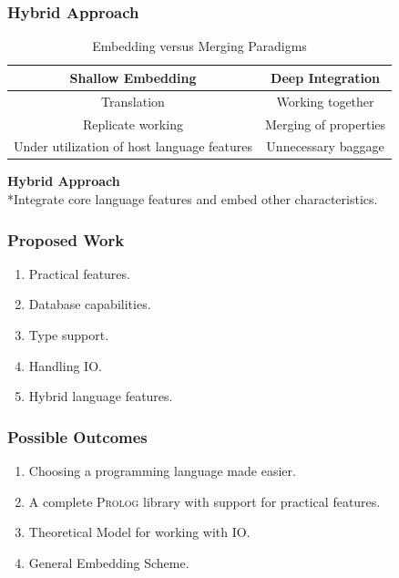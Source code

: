 \documentclass[aspectratio=1610]{beamer}
\begin{document}


\begin{frame}
\frametitle{Hybrid Approach}
\center
\begin{table}%
\begin{tabular}{|c|c|}
\hline
\textbf{Shallow Embedding} & \textbf{Deep Integration}\\
\hline
Translation & Working together\\
\hline
Replicate working & Merging of properties \\
\hline
Under utilization of host language features & Unnecessary baggage \\
\hline
\end{tabular}
\caption{Embedding versus Merging Paradigms}
\label{}
\end{table}

\vspace{2mm}

\textbf{Hybrid Approach}
\\*Integrate core language features and embed other characteristics.

\end{frame}


\begin{frame}
\frametitle{Proposed Work}
\begin{enumerate}
	\item Practical features.
	
	\item Database capabilities.
	
	\item Type support.
	
	\item Handling IO.
	
	\item Hybrid language features. 
\end{enumerate}
\end{frame}

\begin{frame}
	\frametitle{Possible Outcomes}
	
\begin{enumerate}
\item Choosing a programming language made easier.

\item A complete \textsc{Prolog} library with support for practical features.

\item Theoretical Model for working with IO.

\item General Embedding Scheme.   
\end{enumerate}
\end{frame}
\end{document}
